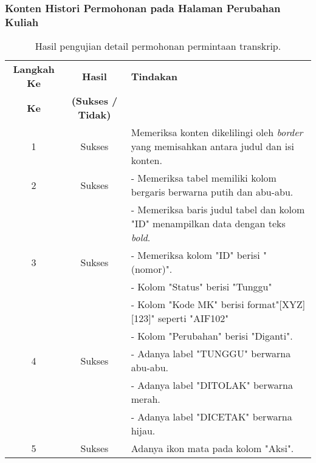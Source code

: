 \subsubsection{Konten Histori Permohonan pada Halaman Perubahan Kuliah}
\begin{table}[H]
	\centering 
	\caption{Hasil pengujian detail permohonan permintaan transkrip.}
	\label{hasil:HistoriPermohonanPerubahanKuliah}
		\begin{tabular}{|c| c| p{}|}
		\toprule
		\textbf{Langkah Ke} & \textbf{Hasil} & \textbf{Tindakan}\\
		\textbf{Ke} & \textbf{(Sukses / Tidak)} &\\
		\midrule
		1&Sukses&Memeriksa konten dikelilingi oleh \textit{border} yang memisahkan antara judul dan isi konten.\\
		\hline
		2&Sukses&- Memeriksa tabel memiliki kolom bergaris berwarna putih dan abu-abu.\\
		&&- Memeriksa baris judul tabel dan kolom "ID" menampilkan data dengan teks \textit{bold}.\\
		\hline
		3&Sukses& - Memeriksa kolom "ID" berisi "(nomor)".\\
		&& - Kolom "Status" berisi "Tunggu" \\
		&& - Kolom "Kode MK" berisi format"[XYZ][123]" seperti "AIF102" \\
		&& - Kolom "Perubahan" berisi "Diganti".\\
		\hline
		4&Sukses& - Adanya label "TUNGGU" berwarna abu-abu.\\
		&& - Adanya label "DITOLAK" berwarna merah.\\
		&& - Adanya label "DICETAK" berwarna hijau.\\
		\hline
		5&Sukses& Adanya ikon mata pada kolom "Aksi".\\		
		\bottomrule		
	\end{tabular} 
\end{table}

